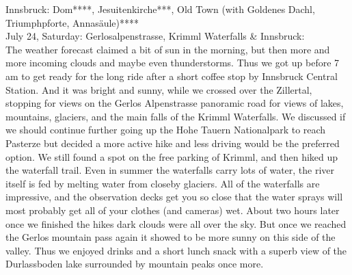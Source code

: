 {Innsbruck: Dom****, Jesuitenkirche***, Old Town (with Goldenes Dachl, Triumphpforte, Annas\"aule)****\\

July 24, Saturday: Gerlosalpenstrasse, Krimml Waterfalls \& Innsbruck:\\
The weather forecast claimed a bit of sun in the morning, but then more and more incoming clouds and maybe even thunderstorms. Thus we got up before 7 am to get ready for the long ride after a short coffee stop by Innsbruck Central Station. And it was bright and sunny, while we crossed over the Zillertal, stopping for views on the Gerlos Alpenstrasse panoramic road for views of lakes, mountains, glaciers, and the main falls of the Krimml Waterfalls. We discussed if we should continue further going up the Hohe Tauern Nationalpark to reach Pasterze but decided a more active hike and less driving would be the preferred option. We still found a spot on the free parking of Krimml, and then hiked up the waterfall trail. Even in summer the waterfalls carry lots of water, the river itself is fed by melting water from closeby glaciers. All of the waterfalls are impressive, and the observation decks get you so close that the water sprays will most probably get all of your clothes (and cameras) wet. About two hours later once we finished the hikes dark clouds were all over the sky. But once we reached the Gerlos mountain pass again it showed to be more sunny on this side of the valley. Thus we enjoyed drinks and a short lunch snack with a superb view of the Durlassboden lake surrounded by mountain peaks once more.\\

}
